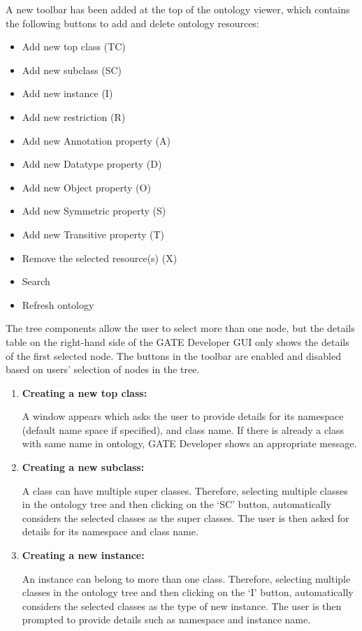 {A new toolbar has been added at the top of the ontology viewer, which contains
the following buttons to add and delete ontology resources:
\begin{itemize}
\item Add new top class (TC)
\item Add new subclass (SC)
\item Add new instance (I)
\item Add new restriction (R)
\item Add new Annotation property (A)
\item Add new Datatype property (D)
\item Add new Object property (O)
\item Add new Symmetric property (S)
\item Add new Transitive property (T)
\item Remove the selected resource(s) (X)
\item Search
\item Refresh ontology
\end{itemize}

The tree components allow the user to select more than one node, but
the details table on the right-hand side of the GATE Developer GUI
only shows the details of the first selected node. The buttons in the
toolbar are enabled and disabled based on users' selection of nodes in
the tree.

\begin{enumerate}
\item \textbf{Creating a new top class:}

A window appears which asks the user to provide details for its namespace (default
name space if specified), and class name. If there is already a class with same
name in ontology, GATE Developer shows an appropriate message. 

\item \textbf{Creating a new subclass:}

A class can have multiple super classes.  Therefore, selecting multiple classes in
the ontology tree and then clicking on the `SC' button, automatically considers
the selected classes as the super classes.  The user is then asked for details for
its namespace and class name.

\item \textbf{Creating a new instance:}

An instance can belong to more than one class.  Therefore, selecting multiple
classes in the ontology tree and then clicking on the `I' button, automatically
considers the selected classes as the type of new instance.  The user is then
prompted to provide details such as namespace and instance name.


\end{enumerate}}
